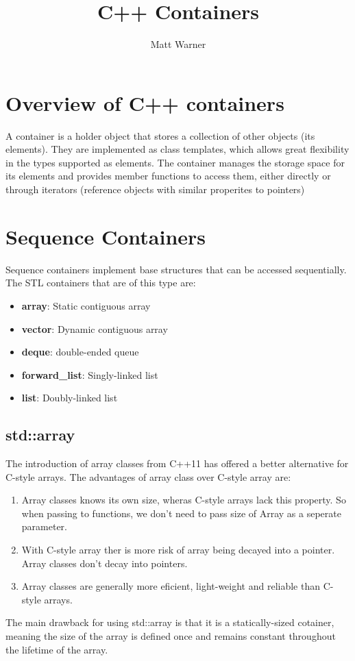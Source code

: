 \documentclass{report}
\title{\Huge{C++ Containers}}
\author{\huge{Matt Warner}}
\date{\huge{}}
\begin{document}
    \maketitle
    \section{Overview of C++ containers}
    A container is a holder object that stores a collection of other objects (its elements). They are implemented as class templates, which allows great flexibility in the types supported as elements.
    \bigbreak \noindent
    The container manages the storage space for its elements and provides member functions to access them, either directly or through iterators (reference objects with similar properites to pointers)
    \section{Sequence Containers}
    Sequence containers implement base structures that can be accessed sequentially. The STL containers that are of this type are:
    \begin{itemize}
        \item \textbf{array}: Static contiguous array
        \item \textbf{vector}: Dynamic contiguous array
        \item \textbf{deque}: double-ended queue
        \item \textbf{forward\_list}: Singly-linked list
        \item \textbf{list}: Doubly-linked list
    \end{itemize}
    \subsection{std::array}
    The introduction of array classes from C++11 has offered a better alternative for C-style arrays. The advantages of array class over C-style array are:
    \begin{enumerate}
        \item Array classes knows its own size, wheras C-style arrays lack this property. So when passing to functions, we don't need to pass size of Array as a seperate parameter.
        \item With C-style array ther is more risk of array being decayed into a pointer. Array classes don't decay into pointers.
        \item Array classes are generally more eficient, light-weight and reliable than C-style arrays.
    \end{enumerate}
    The main drawback for using std::array is that it is a statically-sized cotainer, meaning the size of the array is defined once and remains constant throughout the lifetime of the array.
\end{document}
